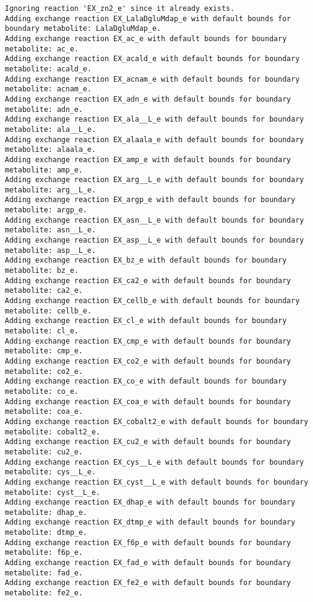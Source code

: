 \documentclass[
  letterpaper,
  DIV=11,
  numbers=noendperiod]{scrartcl}
\begin{document}
\begin{verbatim}
Ignoring reaction 'EX_zn2_e' since it already exists.
Adding exchange reaction EX_LalaDgluMdap_e with default bounds for boundary metabolite: LalaDgluMdap_e.
Adding exchange reaction EX_ac_e with default bounds for boundary metabolite: ac_e.
Adding exchange reaction EX_acald_e with default bounds for boundary metabolite: acald_e.
Adding exchange reaction EX_acnam_e with default bounds for boundary metabolite: acnam_e.
Adding exchange reaction EX_adn_e with default bounds for boundary metabolite: adn_e.
Adding exchange reaction EX_ala__L_e with default bounds for boundary metabolite: ala__L_e.
Adding exchange reaction EX_alaala_e with default bounds for boundary metabolite: alaala_e.
Adding exchange reaction EX_amp_e with default bounds for boundary metabolite: amp_e.
Adding exchange reaction EX_arg__L_e with default bounds for boundary metabolite: arg__L_e.
Adding exchange reaction EX_argp_e with default bounds for boundary metabolite: argp_e.
Adding exchange reaction EX_asn__L_e with default bounds for boundary metabolite: asn__L_e.
Adding exchange reaction EX_asp__L_e with default bounds for boundary metabolite: asp__L_e.
Adding exchange reaction EX_bz_e with default bounds for boundary metabolite: bz_e.
Adding exchange reaction EX_ca2_e with default bounds for boundary metabolite: ca2_e.
Adding exchange reaction EX_cellb_e with default bounds for boundary metabolite: cellb_e.
Adding exchange reaction EX_cl_e with default bounds for boundary metabolite: cl_e.
Adding exchange reaction EX_cmp_e with default bounds for boundary metabolite: cmp_e.
Adding exchange reaction EX_co2_e with default bounds for boundary metabolite: co2_e.
Adding exchange reaction EX_co_e with default bounds for boundary metabolite: co_e.
Adding exchange reaction EX_coa_e with default bounds for boundary metabolite: coa_e.
Adding exchange reaction EX_cobalt2_e with default bounds for boundary metabolite: cobalt2_e.
Adding exchange reaction EX_cu2_e with default bounds for boundary metabolite: cu2_e.
Adding exchange reaction EX_cys__L_e with default bounds for boundary metabolite: cys__L_e.
Adding exchange reaction EX_cyst__L_e with default bounds for boundary metabolite: cyst__L_e.
Adding exchange reaction EX_dhap_e with default bounds for boundary metabolite: dhap_e.
Adding exchange reaction EX_dtmp_e with default bounds for boundary metabolite: dtmp_e.
Adding exchange reaction EX_f6p_e with default bounds for boundary metabolite: f6p_e.
Adding exchange reaction EX_fad_e with default bounds for boundary metabolite: fad_e.
Adding exchange reaction EX_fe2_e with default bounds for boundary metabolite: fe2_e.

\end{verbatim}
\end{document}
